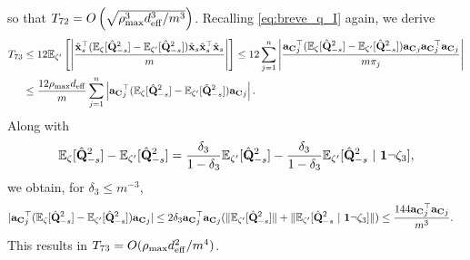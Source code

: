 \documentclass[11pt,a4paper]{article}
\begin{document}
so that $ T_{72}=O\left(\sqrt{\rho_{\max}^3 d^3_{\mathrm{eff}}/m^3}\right)$.
Recalling \eqref{eq:breve_q_I} again, we derive
\begin{align}
  T_{73}& \leq 12{\mathbb{E}}_{\zeta'}\left[\left|\frac{\hat{\mathbf{x}}_s^\top({\mathbb{E}}_{\zeta}[\hat{\mathbf{Q}}^2_{-s}]-{\mathbb{E}}_{\zeta'}[\hat{\mathbf{Q}}^2_{-s}])\hat{\mathbf{x}}_s\hat{\mathbf{x}}_s^\top\hat{\mathbf{x}}_s}{m}\right|\right] 
  \leq   12\sum^n_{j=1}\left|\frac{{\mathbf{a}_{\mathbf{C}}}_j^\top({\mathbb{E}}_{\zeta}[\hat{\mathbf{Q}}^2_{-s}]-{\mathbb{E}}_{\zeta'}[\hat{\mathbf{Q}}^2_{-s}]){\mathbf{a}_{\mathbf{C}}}_j{\mathbf{a}_{\mathbf{C}}}_j^\top{\mathbf{a}_{\mathbf{C}}}_j}{m\pi_j}\right| \nonumber\\
    &\leq \frac{12\rho_{\max} d_{\mathrm{eff}}}{m}\sum^n_{j=1} \left|{\mathbf{a}_{\mathbf{C}}}_j^\top({\mathbb{E}}_{\zeta}[\hat{\mathbf{Q}}^2_{-s}]-{\mathbb{E}}_{\zeta'}[\hat{\mathbf{Q}}^2_{-s}]){\mathbf{a}_{\mathbf{C}}}_j \right|. \nonumber
\end{align}
Along with 
\begin{align}
   {\mathbb{E}}_{\zeta}[\hat{\mathbf{Q}}^2_{-s}]-{\mathbb{E}}_{\zeta'}[\hat{\mathbf{Q}}^2_{-s}]=\frac{\delta_3}{1-\delta_3}{\mathbb{E}}_{\zeta'}[\hat{\mathbf{Q}}^2_{-s}] -\frac{\delta_3}{1-\delta_3}{\mathbb{E}}_{\zeta'}[\hat{\mathbf{Q}}^2_{-s} ~|~ \mathbf{1}\neg\zeta_3],\nonumber
\end{align}
we obtain, for   $\delta_3\leq m^{-3}$,
\begin{align}
   &|{\mathbf{a}_{\mathbf{C}}}_j^\top({\mathbb{E}}_{\zeta}[\hat{\mathbf{Q}}^2_{-s}]-{\mathbb{E}}_{\zeta'}[\hat{\mathbf{Q}}^2_{-s}]){\mathbf{a}_{\mathbf{C}}}_j|\leq 2\delta_3 {\mathbf{a}_{\mathbf{C}}}_j^\top {\mathbf{a}_{\mathbf{C}}}_j(\|{\mathbb{E}}_{\zeta'}[\hat{\mathbf{Q}}^2_{-s}]\|+\|{\mathbb{E}}_{\zeta'}[\hat{\mathbf{Q}}^2_{-s}~|~\mathbf{1}\neg\zeta_3]\|)\leq \frac{144{\mathbf{a}_{\mathbf{C}}}_j^\top {\mathbf{a}_{\mathbf{C}}}_j}{m^3}.\nonumber
\end{align}
This   results in 
$ T_{73}=O(\rho_{\max} d^2_{\mathrm{eff}}/m^4)$.
\end{document}
